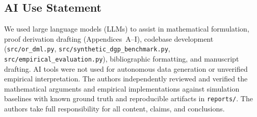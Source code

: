 \documentclass[twoside]{article}
\theoremstyle{definition}
\begin{document}
\clearpage

\subsection*{AI Use Statement}
We used large language models (LLMs) to assist in mathematical formulation, proof derivation drafting (Appendices~A--I), codebase development (\texttt{src/or\_dml.py}, \texttt{src/synthetic\_dgp\_benchmark.py}, \texttt{src/empirical\_evaluation.py}), bibliographic formatting, and manuscript drafting. AI tools were not used for autonomous data generation or unverified empirical interpretation. The authors independently reviewed and verified the mathematical arguments and empirical implementations against simulation baselines with known ground truth and reproducible artifacts in \texttt{reports/}. The authors take full responsibility for all content, claims, and conclusions.
\end{document}
